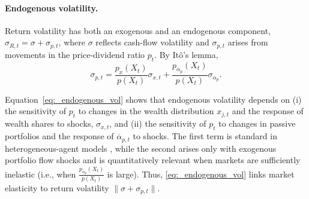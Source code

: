 
\paragraph{Endogenous volatility.} 

Return volatility has both an exogenous and an endogenous component, $\sigma_{R,t} = \sigma + \sigma_{p,t}$, where $\sigma$ reflects cash-flow volatility and $\sigma_{p,t}$ arises from movements in the price-dividend ratio $p_t$. 
By Itô’s lemma,  
\begin{equation}\label{eq:_endogenous_vol}
    \sigma_{p,t} = \frac{p_x(X_t)}{p(X_t)} \sigma_{x,t} 
    + \frac{p_{\overline{\alpha}_p}(X_t)}{p(X_t)} \sigma_{\alpha_p}. %
\end{equation}

Equation~\eqref{eq:_endogenous_vol} shows that endogenous volatility depends on (i) the sensitivity of $p_t$ to changes in the wealth distribution $x_{j,t}$ and the response of wealth shares to shocks, $\sigma_{x,t}$, and (ii) the sensitivity of $p_t$ to changes in passive portfolios and the response of $\overline{\alpha}_{p,t}$ to shocks. The first term is standard in heterogeneous-agent models \citep[see][]{panageas2020implications}, while the second arises only with exogenous portfolio flow shocks and is quantitatively relevant when markets are sufficiently inelastic (i.e., when $\frac{p_{\overline{\alpha}_p}(X_t)}{p(X_t)}$ is large). Thus, \eqref{eq:_endogenous_vol} links market elasticity to return volatility $\|\sigma+\sigma_{p,t}\|$.

